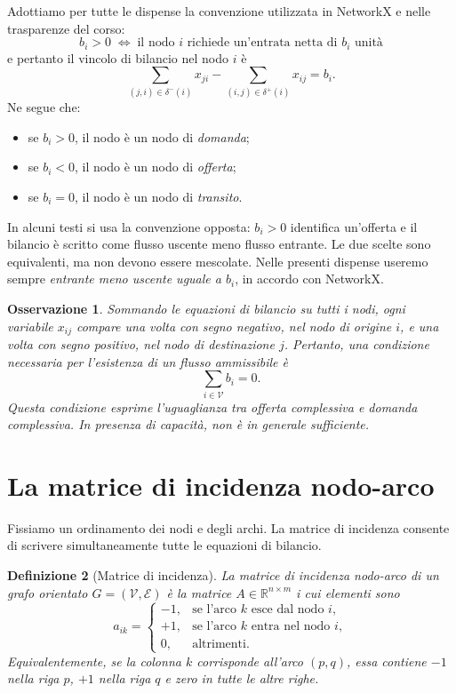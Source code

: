 \documentclass[11pt,a4paper]{article}
\newtheorem{definition}{Definizione}[section]
\newtheorem{observation}[definition]{Osservazione}
\newcommand{\R}{\mathbb{R}}
\newcommand{\V}{\mathcal{V}}
\newcommand{\E}{\mathcal{E}}
\newcommand{\deltaout}{\delta^{+}}
\newcommand{\deltain}{\delta^{-}}
\begin{document}
Adottiamo per tutte le dispense la convenzione utilizzata in NetworkX e nelle trasparenze del corso:
\[
\boxed{
  b_i>0\;\Longleftrightarrow\;\text{il nodo $i$ richiede un'entrata netta di $b_i$ unità}
}
\]
e pertanto il vincolo di bilancio nel nodo $i$ è
\begin{equation}\label{eq:balance}
  \sum_{(j,i)\in\deltain(i)}x_{ji}
  -\sum_{(i,j)\in\deltaout(i)}x_{ij}=b_i.
\end{equation}
Ne segue che:
\begin{itemize}
  \item se $b_i>0$, il nodo è un nodo di \emph{domanda};
  \item se $b_i<0$, il nodo è un nodo di \emph{offerta};
  \item se $b_i=0$, il nodo è un nodo di \emph{transito}.
\end{itemize}

\begin{warningbox}
In alcuni testi si usa la convenzione opposta: $b_i>0$ identifica un'offerta e il bilancio è scritto come flusso uscente meno flusso entrante. Le due scelte sono equivalenti, ma non devono essere mescolate. Nelle presenti dispense useremo sempre \emph{entrante meno uscente uguale a $b_i$}, in accordo con NetworkX.
\end{warningbox}

\begin{observation}
Sommando le equazioni di bilancio su tutti i nodi, ogni variabile $x_{ij}$ compare una volta con segno negativo, nel nodo di origine $i$, e una volta con segno positivo, nel nodo di destinazione $j$. Pertanto, una condizione necessaria per l'esistenza di un flusso ammissibile è
\begin{equation}\label{eq:globalbalance}
  \sum_{i\in\V} b_i=0.
\end{equation}
Questa condizione esprime l'uguaglianza tra offerta complessiva e domanda complessiva. In presenza di capacità, non è in generale sufficiente.
\end{observation}

\section{La matrice di incidenza nodo-arco}

Fissiamo un ordinamento dei nodi e degli archi. La matrice di incidenza consente di scrivere simultaneamente tutte le equazioni di bilancio.

\begin{definition}[Matrice di incidenza]
La matrice di incidenza nodo-arco di un grafo orientato $G=(\V,\E)$ è la matrice $A\in\R^{n\times m}$ i cui elementi sono
\[
  a_{ik}=\begin{cases}
  -1, & \text{se l'arco $k$ esce dal nodo $i$},\\
  +1, & \text{se l'arco $k$ entra nel nodo $i$},\\
  0,  & \text{altrimenti}.
  \end{cases}
\]
Equivalentemente, se la colonna $k$ corrisponde all'arco $(p,q)$, essa contiene $-1$ nella riga $p$, $+1$ nella riga $q$ e zero in tutte le altre righe.
\end{definition}
\end{document}
